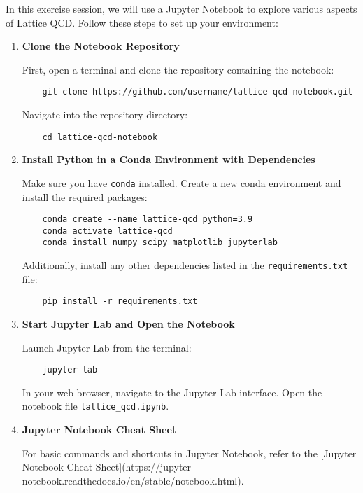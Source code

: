 \documentclass[11pt]{latex/exercise}
\begin{document}
\makeheader

\morning



\afternoon

In this exercise session, we will use a Jupyter Notebook to explore various aspects of Lattice QCD.
Follow these steps to set up your environment:

\begin{enumerate}
    \item \textbf{Clone the Notebook Repository}

          First, open a terminal and clone the repository containing the notebook:
          \begin{verbatim}
    git clone https://github.com/username/lattice-qcd-notebook.git
    \end{verbatim}
          Navigate into the repository directory:
          \begin{verbatim}
    cd lattice-qcd-notebook
    \end{verbatim}

    \item \textbf{Install Python in a Conda Environment with Dependencies}

          Make sure you have \texttt{conda} installed. Create a new conda environment and install the required packages:
          \begin{verbatim}
    conda create --name lattice-qcd python=3.9
    conda activate lattice-qcd
    conda install numpy scipy matplotlib jupyterlab
    \end{verbatim}

          Additionally, install any other dependencies listed in the \texttt{requirements.txt} file:
          \begin{verbatim}
    pip install -r requirements.txt
    \end{verbatim}

    \item \textbf{Start Jupyter Lab and Open the Notebook}

          Launch Jupyter Lab from the terminal:
          \begin{verbatim}
    jupyter lab
    \end{verbatim}
          In your web browser, navigate to the Jupyter Lab interface. Open the notebook file \texttt{lattice\_qcd.ipynb}.

    \item \textbf{Jupyter Notebook Cheat Sheet}

          For basic commands and shortcuts in Jupyter Notebook, refer to the [Jupyter Notebook Cheat Sheet](https://jupyter-notebook.readthedocs.io/en/stable/notebook.html).
\end{enumerate}

\end{document}
